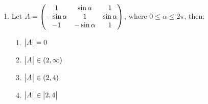 \documentclass{article}
\begin{document}
\begin{enumerate}
     \item Let $A = \begin{pmatrix}1 & \sin\alpha & 1 \\ -\sin\alpha & 1 & \sin\alpha \\ -1 & -\sin\alpha & 1\end{pmatrix}$, where $0 \leq \alpha \leq 2\pi$, then:
    \begin{enumerate}
        \item $\begin{vmatrix}A\end{vmatrix}=0$
        \item $\begin{vmatrix}A\end{vmatrix} \in (2,\infty)$
        \item $\begin{vmatrix}A\end{vmatrix} \in (2,4)$
        \item $\begin{vmatrix}A\end{vmatrix} \in \begin{vmatrix}2,4\end{vmatrix}$
    \end{enumerate}
\end{enumerate}
\end{document}
